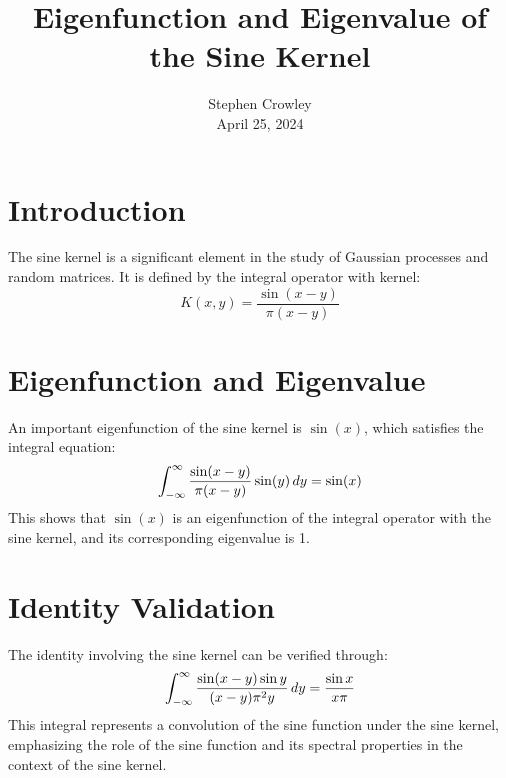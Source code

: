 \documentclass{article}
\newcommand{\tmaffiliation}[1]{\\ #1}
\begin{document}
\title{Eigenfunction and Eigenvalue of the Sine Kernel}

\author{
  Stephen Crowley
  \tmaffiliation{April 25, 2024}
}

\maketitle

\section{Introduction}

The sine kernel is a significant element in the study of Gaussian processes
and random matrices. It is defined by the integral operator with kernel:
\begin{equation}
  K (x, y) = \frac{\sin (x - y)}{\pi (x - y)}
\end{equation}

\section{Eigenfunction and Eigenvalue}

An important eigenfunction of the sine kernel is $\sin (x)$, which satisfies
the integral equation:
\begin{equation}
  \int_{- \infty}^{\infty} \frac{\sin (x - y)}{\pi (x - y)} \sin (y) 
  \hspace{0.17em} dy = \sin (x)
\end{equation}
This shows that $\sin (x)$ is an eigenfunction of the integral operator with
the sine kernel, and its corresponding eigenvalue is 1.

\section{Identity Validation}

The identity involving the sine kernel can be verified through:
\begin{equation}
  \int_{- \infty}^{\infty} \frac{\sin (x - y) \sin y}{(x - y) \pi^2 y} 
  \hspace{0.17em} dy = \frac{\sin x}{x \pi}
\end{equation}
This integral represents a convolution of the sine function under the sine
kernel, emphasizing the role of the sine function and its spectral properties
in the context of the sine kernel.
\end{document}
